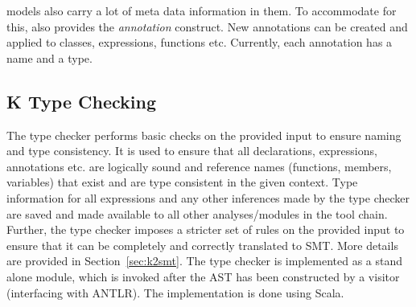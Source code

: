 \sysml{} models also carry a lot of meta data information in them. To
accommodate for this, \Klang{} also provides the {\em annotation}
construct. New annotations can be created and applied to classes,
expressions, functions etc. Currently, each annotation has a name and
a type.

\subsection{K Type Checking}

The \Klang{} type checker performs basic checks on the provided input
to ensure naming and type consistency. It is used to ensure that all
declarations, expressions, annotations etc. are logically sound and
reference names (functions, members, variables) that exist and are
type consistent in the given context. Type information for all
expressions and any other inferences made by the type checker are
saved and made available to all other analyses/modules in the \Klang{}
tool chain. Further, the type checker imposes a stricter set of rules
on the provided input to ensure that it can be completely and
correctly translated to SMT. More details are provided in
Section~\ref{sec:k2smt}. The type checker is implemented as a stand
alone module, which is invoked after the AST has been constructed by a
visitor (interfacing with ANTLR). The implementation is done using
Scala.

